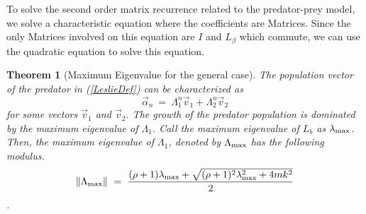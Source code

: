 \documentclass[11pt,reqno]{amsart}
\numberwithin{equation}{section}
\theoremstyle{plain}
\newtheorem{theorem}[thm]{Theorem}
\begin{document}
To solve the second order matrix 
recurrence related to 
the predator-prey model, 
we solve a characteristic equation 
where the coefficients are Matrices. 
Since the only Matrices involved on this equation are $I$ and $L_\beta$
which commute, we can use the quadratic equation to solve this equation. 


\begin{theorem}[Maximum Eigenvalue for the general case]\label{eqn:MaxEvalGen}
    The population vector of the predator in (\ref{LeslieDef}) 
    can be characterized as 
    \begin{equation}
    \vec \alpha_n \ =\ \Lambda_1^{n}  \vec v_1+ \Lambda_2^{n}\vec v_2
    \end{equation}
    for some vectors $\vec v_1$ and $\vec v_2$. The 
    growth of the predator population 
    is dominated by the maximum eigenvalue 
    of $\Lambda_1$. Call the maximum eigenvalue of $L_b$ 
    as $\lambda_{\rm max}$. Then, the maximum eigenvalue of $\Lambda_1$, 
    denoted by $\Lambda_{\rm max}$ has the following modulus. 
    \begin{equation}
        \|\Lambda_{\rm max} \| \ =\   \frac {
            (\rho + 1)\lambda_{\rm max} + \sqrt{(\rho + 1)^2 \lambda_{\rm max}^2 + 4mk^2}
        } 2
    \end{equation}. 
\end{theorem}
\end{document}
